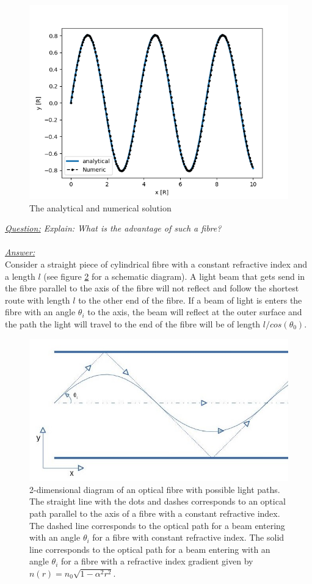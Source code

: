 \documentclass{article}
\begin{document}
\begin{figure}[h!]
	\centering
	\includegraphics[width=0.55\linewidth,keepaspectratio]{afbeeldingen/numerical_and_analytical.png}
	\caption{The analytical and numerical solution}
	\label{fig:bothsolutions}
\end{figure}
\textit{\underline{Question:} Explain: What is the advantage of such a fibre?}\\
\\
\textit{\underline{Answer:}} \\
Consider a straight piece of cylindrical fibre with a constant refractive index and a length $l$ (see figure \ref{fig_fibre_path} for a schematic diagram). A light beam that gets send in the fibre parallel to the axis of the fibre will not reflect and follow the shortest route with length $l$ to the other end of the fibre. If a beam of light is enters the fibre with an angle $\theta _i$ to the axis, the beam will reflect at the outer surface and the path the light will travel to the end of the fibre will be of length $l / cos( \theta _0 )$. \\
\begin{figure}[h!]
	\centering
	\includegraphics[width=0.7\linewidth]{afbeeldingen/fibre_2d_path.jpg}
	\caption{2-dimensional diagram of an optical fibre with possible light paths. The straight line with the dots and dashes corresponds to an optical path parallel to the axis of a fibre with a constant refractive index. The dashed line corresponds to the optical path for a beam entering with an angle $\theta _i$ for a fibre with constant refractive index. The solid line corresponds to the optical path for a beam entering with an angle $\theta _i$ for a fibre with a refractive index gradient given by $n(r) = n_0 \sqrt{1 - \alpha ^2 r^2}$.}
	\label{fig_fibre_path}
\end{figure}
\end{document}
